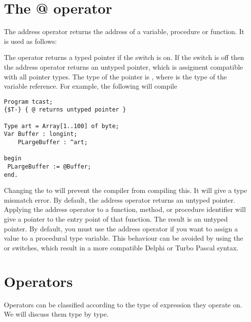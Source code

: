 \documentclass{report}
\begin{document}
\section{The @ operator}
The address operator  returns the address of a variable, procedure
or function. It is used as follows:

The  operator returns a typed pointer if the  switch is on.
If the  switch is off then the address operator returns an untyped
pointer, which is assigment compatible with all pointer types. The type of
the pointer is , where  is the type of the variable
reference.
For example, the following will compile
\begin{verbatim}
Program tcast;
{$T-} { @ returns untyped pointer }

Type art = Array[1..100] of byte;
Var Buffer : longint;
    PLargeBuffer : ^art;

begin
 PLargeBuffer := @Buffer;
end.
\end{verbatim}
Changing the  to  will prevent the compiler from
compiling this. It will give a type mismatch error.
By default, the address operator returns an untyped pointer.
Applying the address operator to a function, method, or procedure identifier
will give a pointer to the entry point of that function. The result is an
untyped pointer.
By default, you must use the address operator if you want to assign a value
to a procedural type variable. This behaviour can be avoided by using the
 or  switches, which result in a more compatible Delphi or
Turbo Pascal syntax.

\section{Operators}
Operators can be classified according to the type of expression they
operate on. We will discuss them type by type.
\end{document}
